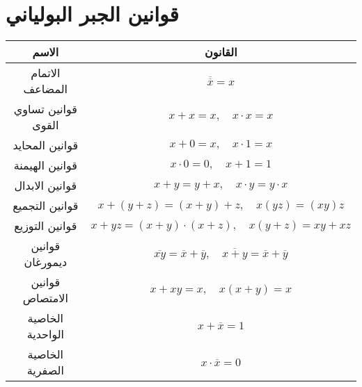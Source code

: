 \section{قوانين الجبر البولياني}

\begin{table}[H]
	\centering
	\renewcommand{\arraystretch}{1.7}
	\begin{tabular}{|c|c|}
		\hline
		\textbf{الاسم} & \textbf{القانون}\\
		\hline
		الاتمام المضاعف & $\overline{\overline{x}} = x$\\
				\hline
		قوانين تساوي القوى & $x+x =x, \quad x\cdot x=x$\\
				\hline
		قوانين المحايد & $x+0=x, \quad x\cdot1=x$\\
				\hline
		قوانين الهيمنة & $x\cdot 0 =0,\quad x+1 =1 $\\
				\hline
		قوانين الابدال & $x+y = y + x, \quad x\cdot y = y\cdot x$\\
				\hline
		قوانين التجميع & $x+(y+z) = (x+y)+z, \quad x(yz)=(xy)z$\\
				\hline
		قوانين التوزيع & $x+yz = (x+y)\cdot(x+z), \quad x(y+z)=xy+xz$\\
				\hline
		قوانين ديمورغان & $\overline{xy} = \overline{x}+\overline{y}, \quad \overline{x+y}= \overline{x}+\overline{y}$\\
				\hline
		قوانين الامتصاص & $x+xy=x, \quad x(x+y)=x$\\
				\hline
		الخاصية الواحدية & $x+\overline{x}=1$ \\
				\hline
		الخاصية الصفرية & $x\cdot \overline{x} = 0$\\
		\hline
	\end{tabular}
\end{table}
